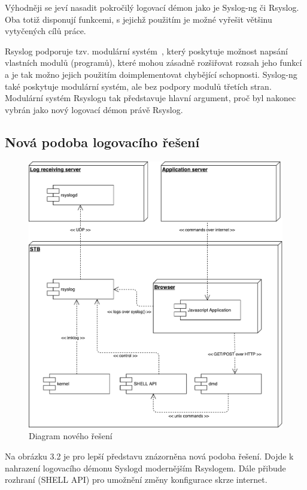 \documentclass[thesis=B,czech]{FITthesis}[2012/06/26]
\begin{document}
Výhodněji se jeví nasadit pokročilý logovací démon jako je Syslog-ng či Rsyslog. Oba totiž disponují funkcemi, s jejichž použitím je možné vyřešit většinu vytyčených cílů práce.

Rsyslog podporuje tzv. modulární systém~\cite{rsysModules}, který poskytuje možnost napsání vlastních modulů (programů), které mohou zásadně rozšiřovat rozsah jeho funkcí a je tak možno jejich použitím doimplementovat chybějící schopnosti. Syslog-ng také poskytuje modulární systém, ale bez podpory modulů třetích stran. Modulární systém Rsyslogu tak představuje hlavní argument, proč byl nakonec vybrán jako nový logovací démon právě Rsyslog.

\subsection{Nová podoba logovacího řešení}
\begin{figure}[H]
	\centering
	\includegraphics[scale=0.5]{images/diagram-noveho-reseni}
	\caption[Diagram nového řešení]{Diagram nového řešení}
\end{figure}

Na obrázku 3.2 je pro lepší představu znázorněna nová podoba řešení. Dojde k nahrazení logovacího démonu Syslogd modernějším Rsyslogem. Dále přibude rozhraní (SHELL API) pro umožnění změny konfigurace skrze internet.
\end{document}
